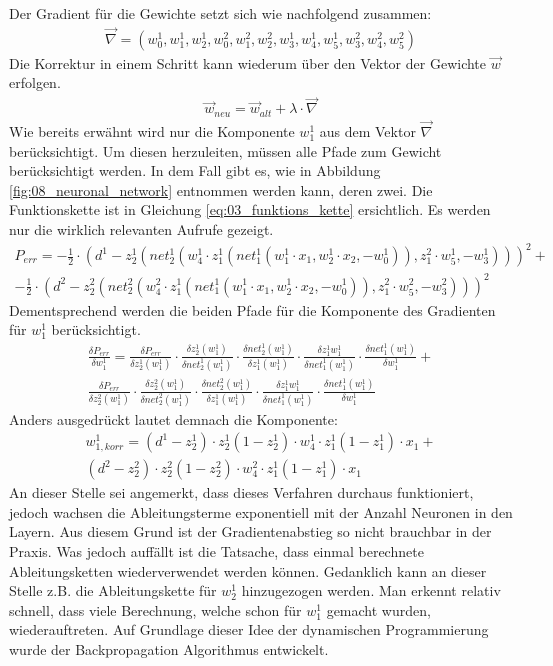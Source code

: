 Der Gradient für die Gewichte setzt sich wie nachfolgend zusammen:
\begin{align}
    \vec{\nabla} = (w_0^1, w_1^1, w_2^1, w_0^2, w_1^2, w_2^2, w_3^1, w_4^1, w_5^1, w_3^2, w_4^2, w_5^2)
\end{align}
Die Korrektur in einem Schritt kann wiederum über den Vektor der Gewichte $\vec{w}$ erfolgen.
\begin{align}
    \vec{w}_{neu} = \vec{w}_{alt} + \lambda \cdot \vec{\nabla}
\end{align}
Wie bereits erwähnt wird nur die Komponente $w_1^1$ aus dem Vektor $\vec{\nabla}$
berücksichtigt. Um diesen herzuleiten, müssen alle Pfade zum Gewicht berücksichtigt werden.
In dem Fall gibt es, wie in Abbildung \ref{fig:08_neuronal_network} entnommen werden kann, deren zwei.
Die Funktionskette ist in Gleichung \ref{eq:03_funktions_kette} ersichtlich. Es werden nur die wirklich relevanten Aufrufe
gezeigt.
\begin{multline}
    P_{err} = - \frac{1}{2} \cdot (d^1 - z_2^1(net_2^1(w_4^1 \cdot z_1^1(net_1^1(w_1^1 \cdot x_1, w_2^1 \cdot x_2, -w_0^1)), z_1^2 \cdot w_5^1, -w_3^1)))^2 +\\\label{eq:03_funktions_kette}
    - \frac{1}{2} \cdot (d^2 - z_2^2(net_2^2(w_4^2 \cdot z_1^1(net_1^1(w_1^1 \cdot x_1, w_2^1 \cdot x_2, -w_0^1)), z_1^2 \cdot w_5^2, -w_3^2)))^2
\end{multline}
Dementsprechend werden die beiden Pfade für die Komponente des Gradienten für $w_1^1$ berücksichtigt.
\begin{multline}
    \frac{\delta P_{err}}{\delta w_1^1} = \frac{\delta P_{err}}{\delta z_2^1(w_1^1)} \cdot \frac{\delta z_2^1(w_1^1)}{\delta net_2^1(w_1^1)} \cdot \frac{\delta net_2^1(w_1^1)}{\delta z_1^1(w_1^1)} \cdot \frac{\delta z_1^1{w_1^1}}{\delta net_1^1(w_1^1)} \cdot \frac{\delta net_1^1(w_1^1)}{\delta w_1^1} +\\
    \frac{\delta P_{err}}{\delta z_2^2(w_1^1)} \cdot \frac{\delta z_2^2(w_1^1)}{\delta net_2^2(w_1^1)} \cdot \frac{\delta net_2^2(w_1^1)}{\delta z_1^1(w_1^1)} \cdot \frac{\delta z_1^1{w_1^1}}{\delta net_1^1(w_1^1)} \cdot \frac{\delta net_1^1(w_1^1)}{\delta w_1^1}
\end{multline}
Anders ausgedrückt lautet demnach die Komponente:
\begin{multline}
    w_{1,korr}^1 = (d^1 - z_2^1) \cdot z_2^1(1 - z_2^1) \cdot w_4^1 \cdot z_1^1(1 - z_1^1) \cdot x_1 +\\
    (d^2 - z_2^2) \cdot z_2^2(1 - z_2^2) \cdot w_4^2 \cdot z_1^1(1 - z_1^1) \cdot x_1
\end{multline}
An dieser Stelle sei angemerkt, dass dieses Verfahren durchaus funktioniert, jedoch wachsen die Ableitungsterme
exponentiell mit der Anzahl Neuronen in den Layern. Aus diesem Grund ist der Gradientenabstieg so nicht brauchbar in
der Praxis. Was jedoch auffällt ist die Tatsache, dass einmal berechnete Ableitungsketten wiederverwendet werden können.
Gedanklich kann an dieser Stelle z.B. die Ableitungskette für $w_2^1$ hinzugezogen werden. Man erkennt relativ schnell,
dass viele Berechnung, welche schon für $w_1^1$ gemacht wurden, wiederauftreten. Auf Grundlage dieser Idee der
dynamischen Programmierung wurde der Backpropagation Algorithmus entwickelt.


